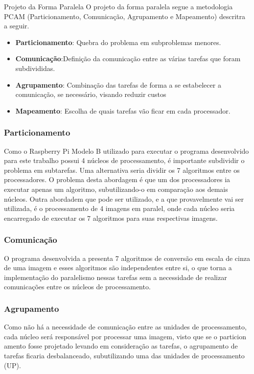 \begin{subsection}{Projeto da Forma Paralela}
O projeto da forma paralela segue a metodologia PCAM (Particionamento,
Comunicação, Agrupamento e Mapeamento) descritra a seguir.

\begin{itemize}
\item \textbf{Particionamento}: Quebra do problema em subproblemas menores.
\item \textbf{Comunicação}:Definição da comunicação entre as várias tarefas que
foram subdivididas.
\item \textbf{Agrupamento}: Combinação das tarefas de forma a se estabelecer a
comunicação, se necessário, visando reduzir custos
\item \textbf{Mapeamento}: Escolha de quais tarefas vão ficar em cada processador.

\end{itemize}

\subsubsection{Particionamento}
Como o Raspberry Pi Modelo B utilizado para executar o programa desenvolvido
para este trabalho possui 4 núcleos de processamento, é importante subdividir o
problema em subtarefas. Uma alternativa seria dividir os 7 algoritmos entre os
processadores. O problema desta abordagem é que um dos processadores ia executar
apenas um algoritmo, subutilizando-o em comparação aos demais núcleos. Outra
abordadem que pode ser utilizado, e a que provavelmente vai ser utilizada, é o
processamento de 4 imagens em paralel, onde cada núcleo seria encarregado de
executar os 7 algoritmos para suas respectivas imagens.

\subsubsection{Comunicação}

O programa desenvolvida a presenta 7 algoritmos de conversão em escala de cinza
de uma imagem e esses algoritmos são independentes entre si, o que torna a
implementação do paralelismo nessas tarefas sem a necessidade de realizar
comunicações entre os núcleos de processamento.

\subsubsection{Agrupamento}
Como não há a necessidade de comunicação entre as unidades de processamento,
cada núcleo será responsável por processar uma imagem, visto que se o particion
amento fosse projetado levando em consideração as tarefas, o agrupamento de
tarefas ficaria desbalanceado, subutilizando uma das unidades de processamento
(UP).


\end{subsection}
